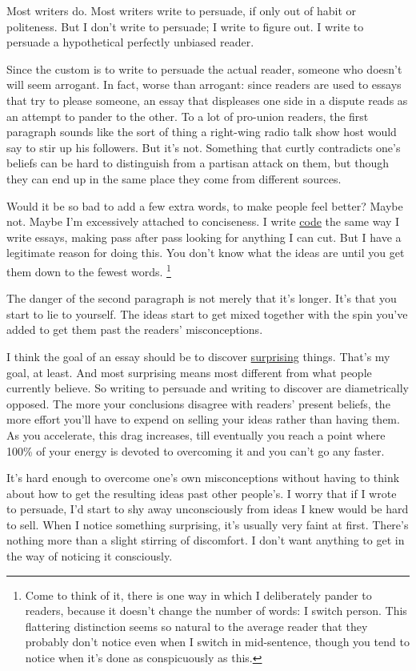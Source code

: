 Most writers do. Most writers write to persuade, if only out of habit or
politeness. But I don't write to persuade; I write to figure out. I
write to persuade a hypothetical perfectly unbiased reader.

Since the custom is to write to persuade the actual reader, someone who
doesn't will seem arrogant. In fact, worse than arrogant: since readers
are used to essays that try to please someone, an essay that displeases
one side in a dispute reads as an attempt to pander to the other. To a
lot of pro-union readers, the first paragraph sounds like the sort of
thing a right-wing radio talk show host would say to stir up his
followers. But it's not. Something that curtly contradicts one's beliefs
can be hard to distinguish from a partisan attack on them, but though
they can end up in the same place they come from different sources.

Would it be so bad to add a few extra words, to make people feel better?
Maybe not. Maybe I'm excessively attached to conciseness. I write
\href{power.html}{code} the same way I write essays, making pass after
pass looking for anything I can cut. But I have a legitimate reason for
doing this. You don't know what the ideas are until you get them down to
the fewest words. \footnote{Come to think of it, there is one way in which I deliberately
pander to readers, because it doesn't change the number of words: I
switch person. This flattering distinction seems so natural to the
average reader that they probably don't notice even when I switch in
mid-sentence, though you tend to notice when it's done as conspicuously
as this.}

The danger of the second paragraph is not merely that it's longer. It's
that you start to lie to yourself. The ideas start to get mixed together
with the spin you've added to get them past the readers' misconceptions.

I think the goal of an essay should be to discover
\href{essay.html}{surprising} things. That's my goal, at least. And most
surprising means most different from what people currently believe. So
writing to persuade and writing to discover are diametrically opposed.
The more your conclusions disagree with readers' present beliefs, the
more effort you'll have to expend on selling your ideas rather than
having them. As you accelerate, this drag increases, till eventually you
reach a point where 100\% of your energy is devoted to overcoming it and
you can't go any faster.

It's hard enough to overcome one's own misconceptions without having to
think about how to get the resulting ideas past other people's. I worry
that if I wrote to persuade, I'd start to shy away unconsciously from
ideas I knew would be hard to sell. When I notice something surprising,
it's usually very faint at first. There's nothing more than a slight
stirring of discomfort. I don't want anything to get in the way of
noticing it consciously.



